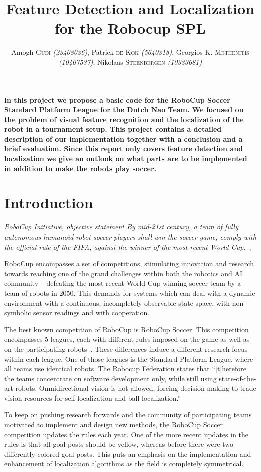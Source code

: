 \documentclass[	DIV=calc,%
							paper=a4,%
							fontsize=9pt,%
							twocolumn]{scrartcl}	 					%
\title{Feature Detection and Localization for the Robocup SPL}					%
\author{Amogh \textsc{Gudi} {\small\emph{(23408036)}}, Patrick \textsc{de Kok} {\small\emph{(5640318)}},
        Georgios \textsc{K. Methenitis} {\small\emph{(10407537)}},
		Nikolaas \textsc{Steenbergen} {\small\emph{(10333681)}}\\}											%
\newcommand{\initial}[1]{%
     \lettrine[lines=3,lhang=0.3,nindent=0em]{
     				\color{DarkGoldenrod}
     				{\textsf{#1}}}{}}
\begin{document}
\maketitle
\thispagestyle{fancy} 			%
\initial{I}\textbf{n this project we propose a basic code for the RoboCup Soccer Standard Platform League for the Dutch Nao Team. We focused on the problem of visual feature recognition and the localization of the robot in a tournament setup. This project contains a detailed description of our implementation together with a conclusion and a brief evaluation. Since this report only covers feature detection and localization we give an outlook on what parts are to be implemented in addition to make the robots play soccer.}

\section{Introduction}
\textit{RoboCup Initiative, objective statement
By mid-21st century, a team of fully autonomous humanoid robot soccer players shall win the soccer game, comply with the official rule of the FIFA, against the winner of the most recent World Cup.}~\cite{RoboCupObjective},~\cite{kitano1997robocup}

RoboCup encompasses a set of competitions, stimulating innovation and research towards reaching one of the grand challenges within both the robotics and AI community -- defeating the most recent World Cup winning soccer team by a team of robots in 2050.  This demands for systems which can deal with a dynamic environment with a continuous, incompletely observable state space, with non-symbolic sensor readings and with cooperation.

The best known competition of RoboCup is RoboCup Soccer.  This competition encompasses 5 leagues, each with different rules imposed on the game as well as on the participating robots~\cite{RoboCupSTL}.  These differences induce a different research focus within each league.  One of those leagues is the Standard Platform League, where all teams use identical robots.  The Robocup Federation states that ``[t]herefore the teams concentrate on software development only, while still using state-of-the-art robots. Omnidirectional vision is not allowed, forcing decision-making to trade vision resources for self-localization and ball localization.''~\cite{RoboCupSTL}

To keep on pushing research forwards and the community of participating teams motivated to implement and design new methods, the RoboCup Soccer competition updates the rules each year.  One of the more recent updates in the rules is that all goal posts should be yellow, whereas before there were two differently colored goal posts.  This puts an emphasis on the implementation and enhancement of localization algorithms as the field is completely symmetrical.
\end{document}
